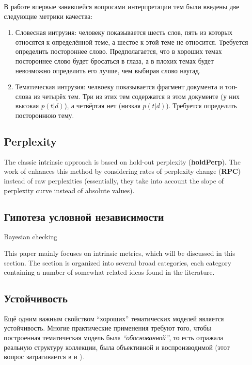 В работе \cite{TODO} впервые занявшейся вопросами интерпретации тем были введены две следующие метрики качества:

\begin{enumerate}
\item{Словесная интрузия: человеку показывается шесть слов, пять из которых относятся к определённой теме, а шестое к этой теме не относится. Требуется определить постороннее слово. Предполагается, что в хороших темах постороннее слово будет бросаться в глаза, а в плохих темах будет невозможно определить его лучше, чем выбирая слово наугад.}
\item{Тематическая интрузия: челвоеку показывается фрагмент документа и топ-слова из четырёх тем. Три из этих тем содержатся в этом документе (у них высокая $p(t|d)$), а четвёртая нет (низкая $p(t|d)$). Требуется определить постороннюю тему.}
\end{enumerate}


\subsection{Perplexity}
The classic intrinsic approach is based on hold-out perplexity \cite{griffiths2004finding} (\textbf{holdPerp}). The work of \cite{zhao15heuristic} enhances this method by considering rates of perplexity change (\textbf{RPC}) instead of raw perplexities (essentially, they take into account the slope of perplexity curve instead of absolute values).

\subsection{Гипотеза условной независимости}
Bayesian checking


This paper mainly focuses on intrinsic metrics, which will be discussed in this section. The section is organized into several broad categories, each category containing a number of somewhat related ideas found in the literature. 


\subsection{Устойчивость}
Ещё одним важным свойством ``хороших'' тематических моделей является устойчивость. Многие практические применения требуют того, чтобы построенная тематическая модель была \textit{``обоснованной''}, то есть отражала реальную структуру коллекции, была объективной и воспроизводимой (этот вопрос затрагивается в \cite{dh_sea} и \cite{agrawal2018wrong}).


